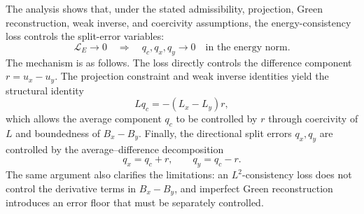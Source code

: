 \documentclass[11pt]{article}
\begin{document}
The analysis shows that, under the stated admissibility, projection,
Green reconstruction, weak inverse, and coercivity assumptions, the
energy-consistency loss controls the split-error variables:
\[
    \mathcal L_E\to0
    \quad\Longrightarrow\quad
    q_c,q_x,q_y\to0
    \quad
    \text{in the energy norm}.
\]
The mechanism is as follows.  The loss directly controls the difference
component \(r=u_x-u_y\).  The projection constraint and weak inverse
identities yield the structural identity
\[
    Lq_c=-(L_x-L_y)r,
\]
which allows the average component \(q_c\) to be controlled by \(r\)
through coercivity of \(L\) and boundedness of \(B_x-B_y\).  Finally, the
directional split errors \(q_x,q_y\) are controlled by the
average--difference decomposition
\[
    q_x=q_c+r,
    \qquad
    q_y=q_c-r.
\]
The same argument also clarifies the limitations: an \(L^2\)-consistency
loss does not control the derivative terms in \(B_x-B_y\), and imperfect
Green reconstruction introduces an error floor that must be separately
controlled.
\end{document}
